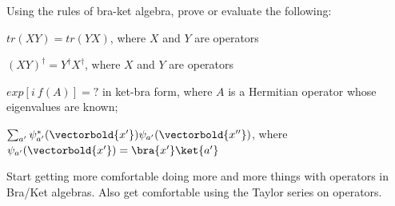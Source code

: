\begin{question}

  Using the rules of bra-ket algebra, prove or evaluate the following:

  \begin{questionpart}
    $tr(XY) = tr(YX)$, where $X$ and $Y$ are operators
  \end{questionpart}

  
  \begin{questionpart}
    $(XY)^\dagger =Y^\dagger X^\dagger$, where $X$ and $Y$ are operators
  \end{questionpart}

  \begin{questionpart}
    $exp[i\ f(A)] = ?$ in ket-bra form, where $A$ is a Hermitian
    operator whose eigenvalues are known;
  \end{questionpart}

  \begin{questionpart}
    $\sum_{a'} \psi_{a'}^*(\vectorbold{x'}) \psi_{a'}(\vectorbold{x''})$,
    where $\psi_{a'}(\vectorbold{x'}) = \bra{x'}\ket{a'}$
  \end{questionpart}

\end{question}

\begin{purpose}
  Start getting more comfortable doing more and more things with
  operators in Bra/Ket algebras.  Also get comfortable using the
  Taylor series on operators.
\end{purpose}

